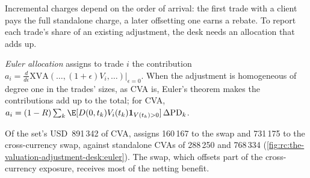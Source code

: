\label{lst:rc:the-valuation-adjustment-desk:euler}

Incremental charges depend on the order of arrival: the first trade with a client pays the
full standalone charge, a later offsetting one earns a rebate. To report each trade's share
of an existing adjustment, the desk needs an allocation that adds up.

\begin{definition}\label{def:rc:the-valuation-adjustment-desk:euler}
\emph{Euler allocation} assigns to trade $i$ the contribution
$a_i = \frac{d}{d\epsilon}\mathrm{XVA}(\ldots,(1+\epsilon)V_i,\ldots)|_{\epsilon=0}$. When the adjustment is
homogeneous of degree one in the trades' sizes, as CVA is, Euler's theorem makes the
contributions add up to the total; for CVA,
$a_i = (1-R)\sum_k\E[D(0,t_k)V_i(t_k)\mathbf 1_{V(t_k)>0}]\,\Delta\mathrm{PD}_k$.
\end{definition}

\begin{example}\label{ex:rc:the-valuation-adjustment-desk:euler}
Of the set's USD~891\,342 of CVA,  assigns 160\,167 to the swap and 731\,175 to
the cross-currency swap, against standalone CVAs of 288\,250 and 768\,334
(\cref{fig:rc:the-valuation-adjustment-desk:euler}). The swap, which offsets part of the
cross-currency exposure, receives most of the netting benefit.
\end{example}

